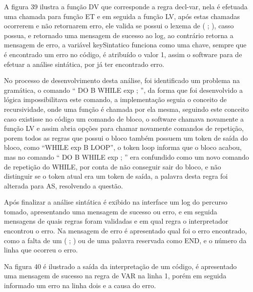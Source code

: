 \documentclass[12pt,oneside,a4paper,chapter=TITLE,section=TITLE,sumario=tradicional]{abntex2}
\begin{document}
A figura 39 ilustra a função DV que corresponde a regra decl-var, nela é efetuada uma chamada para função ET e em seguida a função LV, após estas chamadas ocorrerem e não retornarem erro, ele valida se possui o lexema de ( ; ), casso possua, e retornado uma mensagem de sucesso ao log, ao contrário retorna a mensagem de erro, a variável keySintatico funciona como uma chave, sempre que é encontrado um erro no código, é atribuído o valor 1, assim o software para de efetuar a análise sintática, por já ter encontrado erro. 

\begin{figure}[htb]
\end{figure} 

No processo de desenvolvimento desta análise, foi identificado um problema na gramática, o comando “ DO B WHILE exp ; ”, da forma que foi desenvolvido a lógica impossibilitava este comando, a implementação seguia o conceito de recursividade, onde uma função é chamada por ela mesma, seguindo este conceito caso existisse no código um comando de bloco, o software chamava novamente a função LV e assim abria opções para chamar novamente comandos de repetição, porem todos as regras que possui o bloco também possuem um token de saída do bloco, como “WHILE exp B LOOP”, o token loop informa que o bloco acabou, mas no comando “ DO B WHILE exp ; ” era confundido como um novo comando de repetição do WHILE, por conta de não conseguir sair do bloco, e não distinguir se o token atual era um token de saída, a palavra desta regra foi alterada para AS, resolvendo a questão.

Após finalizar a análise sintática é exibido na interface um log do percurso tomado, apresentando uma mensagem de sucesso ou erro, e em seguida mensagens de quais regras foram validadas e em qual regra o interpretador encontrou o erro.  Na mensagem de erro é apresentado qual foi o erro encontrado, como a falta de um ( ; ) ou de uma palavra reservada como END, e o número da linha que ocorreu o erro.

Na figura 40 é ilustrado a saída da interpretação de um código, é apresentado uma mensagem de sucesso na regra de VAR na linha 1, porém em seguida informado um erro na linha dois e a causa do erro.

\begin{figure}[htb]
\end{figure} 
\end{document}
